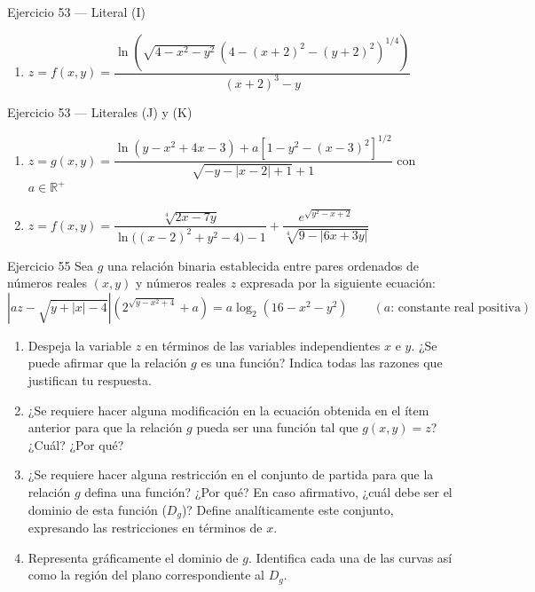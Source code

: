 \documentclass[aspectratio=169, 10pt]{beamer}
\begin{document}
\begin{frame}{Ejercicio 53 — Literal (I)}
  \small
  \begin{enumerate}
    \item[(I)] $z = f(x,y) = \dfrac{\ln\!\left(\sqrt{4 - x^2 - y^2}\,(4 - (x+2)^2 - (y+2)^2)^{1/4}\right)}{(x+2)^3 - y}$
  \end{enumerate}
  \vfill
\end{frame}

\begin{frame}{Ejercicio 53 — Literales (J) y (K)}
  \small
  \begin{enumerate}
    \item[(J)] $z = g(x,y) = \dfrac{\ln(y - x^2 + 4x - 3) + a\left[1 - y^2 - (x-3)^2\right]^{1/2}}{\sqrt{-y - |x-2| + 1} + 1}$ \quad con $a \in \mathbb{R}^+$
    \vspace{2.6cm}
    \item[(K)] $z = f(x,y) = \dfrac{\sqrt[4]{2x - 7y}}{\ln\big((x-2)^2 + y^2 - 4\big) - 1} + \dfrac{e^{\sqrt{y^2 - x + 2}}}{\sqrt[4]{9 - |6x + 3y|}}$
  \end{enumerate}
  \vfill
\end{frame}

\begin{frame}{Ejercicio 55}
  \small
  Sea $g$ una relación binaria establecida entre pares ordenados de números reales $(x,y)$ y números reales $z$ expresada por la siguiente ecuación:
  \[
    \left|az - \sqrt{y + |x| - 4}\right|\left(2^{\sqrt{y - x^2 + 4}} + a\right) = a\log_2(16 - x^2 - y^2) \qquad (a\text{: constante real positiva})
  \]
  \begin{enumerate}
    \item[(A)] Despeja la variable $z$ en términos de las variables independientes $x$ e $y$. ¿Se puede afirmar que la relación $g$ es una función? Indica todas las razones que justifican tu respuesta.
    \item[(B)] ¿Se requiere hacer alguna modificación en la ecuación obtenida en el ítem anterior para que la relación $g$ pueda ser una función tal que $g(x,y) = z$? ¿Cuál? ¿Por qué?
    \item[(C)] ¿Se requiere hacer alguna restricción en el conjunto de partida para que la relación $g$ defina una función? ¿Por qué? En caso afirmativo, ¿cuál debe ser el dominio de esta función ($D_g$)? Define analíticamente este conjunto, expresando las restricciones en términos de $x$.
    \item[(D)] Representa gráficamente el dominio de $g$. Identifica cada una de las curvas así como la región del plano correspondiente al $D_g$.
  \end{enumerate}
  \vfill
\end{frame}
\end{document}
